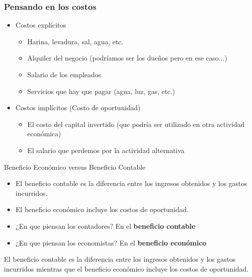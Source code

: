 \documentclass{beamer}
\begin{document}
\begin{frame}
    \frametitle{Pensando en los costos}
    \begin{itemize}
        \item Costos explícitos
        \begin{itemize}
            \item Harina, levadura, sal, agua, etc.
            \item Alquiler del negocio (podríamos ser los dueños pero en ese caso...)
            \item Salario de los empleados 
            \item Servicios que hay que pagar (agua, luz, gas, etc.)
        \end{itemize}
        \item Costos implícitos (Costo de oportunidad)
        \begin{itemize}
            \item El costo del capital invertido (que podría ser utilizado en otra actividad económica)
            \item El salario que perdemos por la actividad alternativa
        \end{itemize}
    \end{itemize}
\end{frame}

\begin{frame}{Beneficio Económico versus Beneficio Contable}
    \begin{itemize}
        \item El beneficio contable es la diferencia entre los ingresos obtenidos y los gastos incurridos.
        \item El beneficio económico incluye los costos de oportunidad.
        \item ¿En que piensan los contadores? En el \textbf{beneficio contable}
        \item ¿En que piensan los economistas? En el \textbf{beneficio económico}
    \end{itemize}

    \begin{boxA}
        \begin{center}
            El beneficio contable es la diferencia entre los ingresos obtenidos y los gastos incurridos mientras que el beneficio económico incluye los costos de oportunidad.
        \end{center}
    \end{boxA}
\end{frame}
\end{document}

